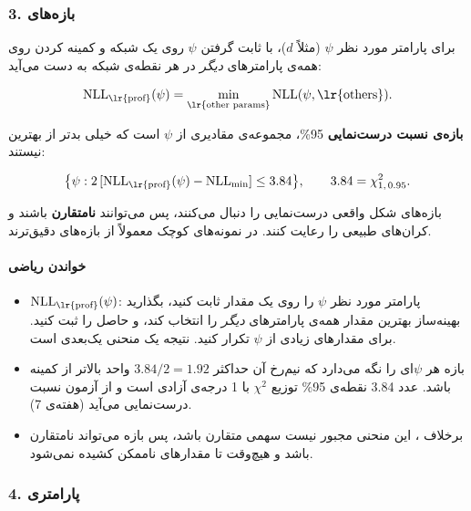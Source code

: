 \subsubsection{\texorpdfstring{3. بازه‌های }{3. بازه‌های profile likelihood}}

برای پارامتر مورد نظر \(\psi\) (مثلاً \(d\))، \textbf{}
با ثابت گرفتن \(\psi\) روی یک شبکه و کمینه کردن  روی همه‌ی
پارامترهای \emph{دیگر} در هر نقطه‌ی شبکه به دست می‌آید:

\[
\mathrm{NLL}_{\text{\lr{prof}}}(\psi) = \min_{\text{\lr{other params}}} \mathrm{NLL}(\psi, \text{\lr{others}}).
\]

\textbf{بازه‌ی نسبت درست‌نمایی } 95\%، مجموعه‌ی مقادیری از
\(\psi\) است که خیلی بدتر از بهترین نیستند:

\[
\big\{\psi : 2\,[\mathrm{NLL}_{\text{\lr{prof}}}(\psi) - \mathrm{NLL}_{\min}] \le 3.84\big\}, \qquad 3.84 = \chi^2_{1,\,0.95}.
\]

بازه‌های  شکل واقعی درست‌نمایی را دنبال می‌کنند، پس می‌توانند
\textbf{نامتقارن} باشند و کران‌های طبیعی را رعایت کنند. در نمونه‌های کوچک
معمولاً از بازه‌های  دقیق‌ترند.

\paragraph{خواندن ریاضی}

\begin{itemize}
\tightlist
\item
  \(\mathrm{NLL}_{\text{\lr{prof}}}(\psi)\): پارامتر مورد نظر \(\psi\) را روی
  یک مقدار ثابت کنید، بگذارید بهینه‌ساز بهترین مقدار همه‌ی پارامترهای
  \emph{دیگر} را انتخاب کند، و  حاصل را ثبت کنید. برای مقدارهای
  زیادی از \(\psi\) تکرار کنید. نتیجه یک منحنی یک‌بعدی است.
\item
  بازه هر \(\psi\)ای را نگه می‌دارد که  نیم‌رخ آن حداکثر
  \(3.84/2 = 1.92\) واحد بالاتر از کمینه باشد. عدد 3.84 نقطه‌ی 95\% توزیع
  \(\chi^2\) با 1 درجه‌ی آزادی است و از آزمون نسبت درست‌نمایی می‌آید (هفته‌ی
  7).
\item
  برخلاف ، این منحنی مجبور نیست سهمی متقارن باشد، پس بازه
  می‌تواند نامتقارن باشد و هیچ‌وقت تا مقدارهای ناممکن کشیده نمی‌شود.
\end{itemize}

\subsubsection{\texorpdfstring{4. 
پارامتری}{4. bootstrap پارامتری}}

